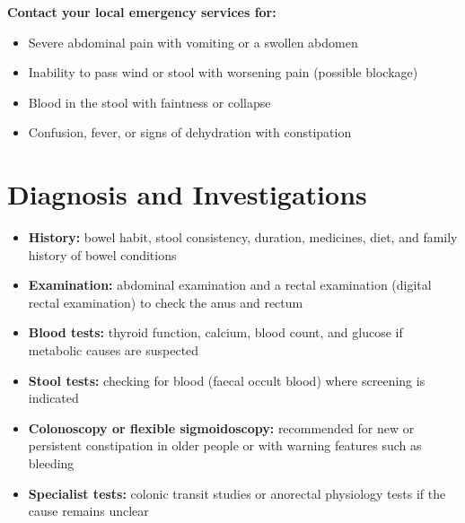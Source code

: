 \textbf{Contact your local emergency services for:}
\begin{itemize}
    \item Severe abdominal pain with vomiting or a swollen abdomen
    \item Inability to pass wind or stool with worsening pain (possible blockage)
    \item Blood in the stool with faintness or collapse
    \item Confusion, fever, or signs of dehydration with constipation
\end{itemize}

\section*{Diagnosis and Investigations}
\begin{itemize}
    \item \textbf{History:} bowel habit, stool consistency, duration, medicines, diet, and family history of bowel conditions
    \item \textbf{Examination:} abdominal examination and a rectal examination (digital rectal examination) to check the anus and rectum
    \item \textbf{Blood tests:} thyroid function, calcium, blood count, and glucose if metabolic causes are suspected
    \item \textbf{Stool tests:} checking for blood (faecal occult blood) where screening is indicated
    \item \textbf{Colonoscopy or flexible sigmoidoscopy:} recommended for new or persistent constipation in older people or with warning features such as bleeding
    \item \textbf{Specialist tests:} colonic transit studies or anorectal physiology tests if the cause remains unclear
\end{itemize}


